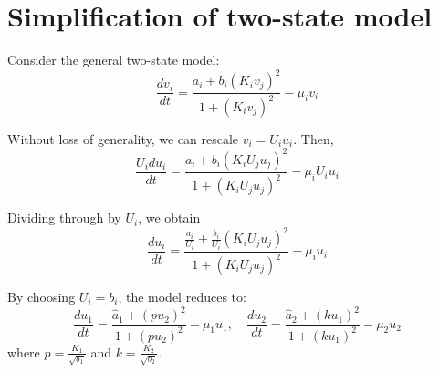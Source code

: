 \section{Simplification of two-state model}

Consider the general two-state model:
\begin{equation}
    \dfrac{dv_i}{dt} = \dfrac{a_i + b_i (K_i v_j)^2}{1 + (K_i v_j)^2} - \mu_i v_i
\end{equation}

Without loss of generality, we can rescale $v_i = U_i u_i$. Then,
\begin{equation}
    \dfrac{U_idu_i}{dt} = \dfrac{a_i + b_i (K_i U_j u_j)^2}{1 + (K_i U_j u_j)^2} - \mu_i U_i u_i
\end{equation}

Dividing through by $U_i$, we obtain
\begin{equation}
    \dfrac{du_i}{dt} = \dfrac{\frac{a_i}{U_i} + \frac{b_i}{U_i} (K_i U_j u_j)^2}{1 + (K_i U_j u_j)^2} - \mu_i u_i
\end{equation}

By choosing $U_i = b_i$, the model reduces to:
\begin{equation}
    \dfrac{du_1}{dt} = \dfrac{\hat{a}_1 + (p u_2)^2}{1 + (p u_2)^2} - \mu_1 u_1, \quad
    \dfrac{du_2}{dt} = \dfrac{\hat{a}_2 + (k u_1)^2}{1 + (k u_1)^2} - \mu_2 u_2
\end{equation}
where $p = \frac{K_1}{\sqrt{b_1}}$ and $k = \frac{K_2}{\sqrt{b_2}}$.